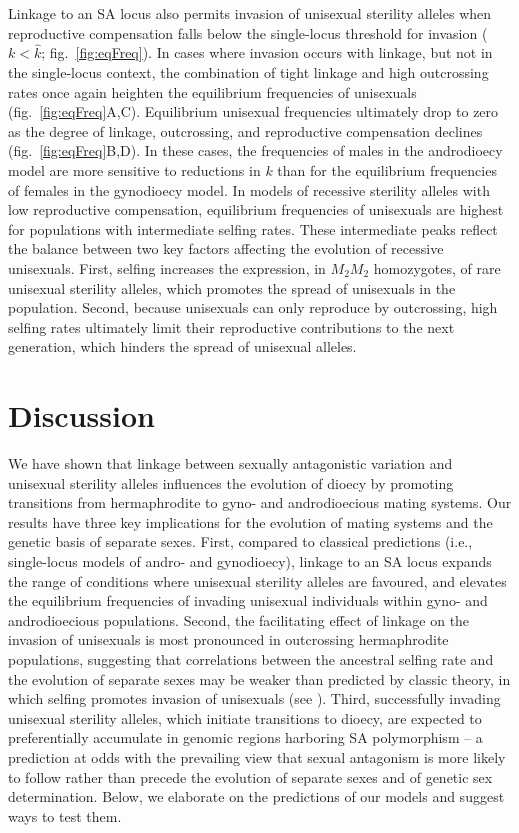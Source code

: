 \documentclass{article}
\begin{document}
Linkage to an SA locus also permits invasion of unisexual sterility alleles when reproductive compensation falls below the single-locus threshold for invasion ($k < \hat{k}$; fig.~\ref{fig:eqFreq}). In cases where invasion occurs with linkage, but not in the single-locus context, the combination of tight linkage and high outcrossing rates once again heighten the equilibrium frequencies of unisexuals (fig.~\ref{fig:eqFreq}A,C). Equilibrium unisexual frequencies ultimately drop to zero as the degree of linkage, outcrossing, and reproductive compensation declines (fig.~\ref{fig:eqFreq}B,D). In these cases, the frequencies of males in the androdioecy model are more sensitive to reductions in $k$ than for the equilibrium frequencies of females in the gynodioecy model. In models of recessive sterility alleles with low reproductive compensation, equilibrium frequencies of unisexuals are highest for populations with intermediate selfing rates. These intermediate peaks reflect the balance between two key factors affecting the evolution of recessive unisexuals. First, selfing increases the expression, in $M_2 M_2$ homozygotes, of rare unisexual sterility alleles, which promotes the spread of unisexuals in the population. Second, because unisexuals can only reproduce by outcrossing, high selfing rates ultimately limit their reproductive contributions to the next generation, which hinders the spread of unisexual alleles. 





\section*{Discussion}

We have shown that linkage between sexually antagonistic variation and unisexual sterility alleles influences the evolution of dioecy by promoting transitions from hermaphrodite to gyno- and androdioecious mating systems. Our results have three key implications for the evolution of mating systems and the genetic basis of separate sexes. First, compared to classical predictions (i.e., single-locus models of andro- and gynodioecy), linkage to an SA locus expands the range of conditions where unisexual sterility alleles are favoured, and elevates the equilibrium frequencies of invading unisexual individuals within gyno- and androdioecious populations. Second, the facilitating effect of linkage on the invasion of unisexuals is most pronounced in outcrossing hermaphrodite populations, suggesting that correlations between the ancestral selfing rate and the evolution of separate sexes may be weaker than predicted by classic theory, in which selfing promotes invasion of unisexuals (see \citealt{Charlesworth1978a}). Third, successfully invading unisexual sterility alleles, which initiate transitions to dioecy, are expected to preferentially accumulate in genomic regions harboring SA polymorphism -- a prediction at odds with the prevailing view that sexual antagonism is more likely to follow rather than precede the evolution of separate sexes and of genetic sex determination. Below, we elaborate on the predictions of our models and suggest ways to test them.
\end{document}
